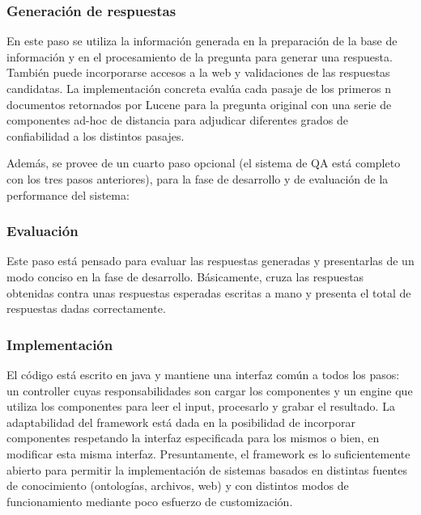 \bigskip

\subsubsection*{Generación de respuestas}
En este paso se utiliza la información generada en la preparación
de la base de información y en el procesamiento de la pregunta para
generar una respuesta. También puede incorporarse accesos a la web y
validaciones de las respuestas candidatas. La implementación concreta
evalúa cada pasaje de los primeros n documentos retornados por Lucene
para la pregunta original con una serie de componentes ad-hoc de
distancia para adjudicar diferentes grados de confiabilidad a los
distintos pasajes. \newline


Además, se provee de un cuarto paso opcional (el sistema de QA está
completo con los tres pasos anteriores), para la fase de desarrollo y
de evaluación de la performance del sistema:\newline


\subsubsection*{Evaluación}

Este paso está pensado para evaluar las respuestas generadas y
presentarlas de un modo conciso en la fase de desarrollo.
Básicamente, cruza las respuestas obtenidas contra unas respuestas
esperadas escritas a mano y presenta el total de respuestas dadas
correctamente.


\bigskip

\subsubsection*{Implementación}

El código está escrito en java y mantiene una interfaz común a
todos los pasos: un controller cuyas responsabilidades son cargar los
componentes y un engine que utiliza los componentes para leer el input,
procesarlo y grabar el resultado. La adaptabilidad del framework está
dada en la posibilidad de incorporar componentes respetando la interfaz
especificada para los mismos o bien, en modificar esta misma interfaz.
Presuntamente, el framework es lo suficientemente abierto para permitir
la implementación de sistemas basados en distintas fuentes de
conocimiento (ontologías, archivos, web) y con distintos modos de
funcionamiento mediante poco esfuerzo de customización.

